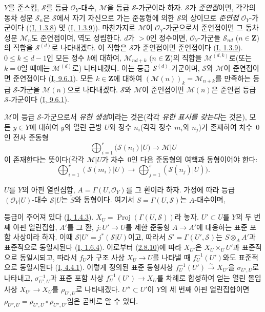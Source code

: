 \begin{env}[3.1.1]
\label{II.3.1.1-ko}
$Y$를 준스킴, $\mathcal{S}$를 등급 $\mathcal{O}_Y$-대수,
$\mathcal{M}$을 등급 $\mathcal{S}$-가군이라 하자. $\mathcal{S}$가
\emph{준연접}이면, 각각의 동차 성분 $\mathcal{S}_n$은 $\mathcal{S}$에서
자기 자신으로 가는 준동형에 의한 $\mathcal{S}$의 상이므로 \emph{준연접}
$\mathcal{O}_Y$-가군이다
((\hyperref[I.1.3.8-ko]{I, 1.3.8}) 및
(\hyperref[I.1.3.9-ko]{I, 1.3.9})). 마찬가지로 $\mathcal{M}$이
$\mathcal{O}_Y$-가군으로서 준연접이면 그 동차 성분 $\mathcal{M}_n$도
준연접이며, 역도 성립한다. $d$가 $>0$인 정수이면,
$\mathcal{O}_Y$-가군들 $\mathcal{S}_{nd}$ ($n\in\mathbf{Z}$)의 직합을
$\mathcal{S}^{(d)}$로 나타내겠다. 이 직합은 $\mathcal{S}$가 준연접이면
준연접이다 (\hyperref[I.1.3.9-ko]{I, 1.3.9}).
$0\leq k\leq d-1$인 모든 정수 $k$에 대하여, $\mathcal{M}_{nd+k}$
($n\in\mathbf{Z}$)의 직합을 $\mathcal{M}^{(d,k)}$로(또는 $k=0$일
때에는 $\mathcal{M}^{(d)}$로) 나타내겠다. 이는 등급
$\mathcal{S}^{(d)}$-가군이며, $\mathcal{S}$와 $\mathcal{M}$이 준연접이면
준연접이다 (\hyperref[I.9.6.1-ko]{I, 9.6.1}). 모든
$k\in\mathbf{Z}$에 대하여
$(\mathcal{M}(n))_k=\mathcal{M}_{n+k}$를 만족하는 등급
$\mathcal{S}$-가군을 $\mathcal{M}(n)$으로 나타내겠다. $\mathcal{S}$와
$\mathcal{M}$이 준연접이면 $\mathcal{M}(n)$은 준연접 등급
$\mathcal{S}$-가군이다 (\hyperref[I.9.6.1-ko]{I, 9.6.1}).

$\mathcal{M}$이 등급 $\mathcal{S}$-가군으로서 \emph{유한 생성}이라는
것은(각각 \emph{유한 표시를 갖는다}는 것은), 모든 $y\in Y$에 대하여
$y$의 열린 근방 $U$와 정수 $n_i$(각각 정수 $m_i$와 $n_j$)가 존재하여
차수~$0$인 전사 준동형
\[
  \bigoplus_{i=1}^r(\mathcal{S}(n_i)|U)\longrightarrow\mathcal{M}|U
\]
이 존재한다는 뜻이다(각각 $\mathcal{M}|U$가 차수~$0$인 다음 준동형의
여핵과 동형이어야 한다:
\[
  \bigoplus_{i=1}^r(\mathcal{S}(m_i)|U)
  \longrightarrow\bigoplus_{j=1}^s(\mathcal{S}(n_j)|U)).
\]

$U$를 $Y$의 아핀 열린집합, $A=\Gamma(U,\mathcal{O}_Y)$를 그 환이라
하자. 가정에 따라 등급 $(\mathcal{O}_Y|U)$-대수 $\mathcal{S}|U$는
$\widetilde{S}$와 동형이다. 여기서 $S=\Gamma(U,\mathcal{S})$는
$A$-대수이며,


등급이 주어져 있다 (\hyperref[I.1.4.3-ko]{I, 1.4.3}).
$X_U=\operatorname{Proj}(\Gamma(U,\mathcal{S}))$라 놓자.
$U'\subset U$를 $Y$의 두 번째 아핀 열린집합, $A'$를 그 환,
$j:U'\to U$를 제한 준동형 $A\to A'$에 대응하는 표준 포함 사상이라
하자. 이때 $\mathcal{S}|U'=j^*(\mathcal{S}|U)$이고, 따라서
$S'=\Gamma(U',\mathcal{S})$는 $S\otimes_A A'$과 표준적으로 동일시된다
(\hyperref[I.1.6.4-ko]{I, 1.6.4}). 이로부터
(\hyperref[II.2.8.10-ko]{2.8.10})에 따라 $X_{U'}$은
$X_U\times_U U'$과 표준적으로 동일시되고, 따라서 $f_U$가 구조 사상
$X_U\to U$를 나타낼 때 $f_U^{-1}(U')$와도 표준적으로 동일시된다
(\hyperref[I.4.4.1-ko]{I, 4.4.1}). 이렇게 정의된 표준 동형사상
$f_U^{-1}(U')\xrightarrow{\sim}X_{U'}$을 $\sigma_{U',U}$로 나타내고,
$\sigma_{U',U}^{-1}$과 표준 포함 사상 $f_U^{-1}(U')\to X_U$를 차례로
합성하여 얻는 열린 몰입 사상 $X_{U'}\to X_U$를 $\rho_{U',U}$로
나타내겠다. $U''\subset U'$이 $Y$의 세 번째 아핀 열린집합이면
$\rho_{U'',U}=\rho_{U',U}\circ\rho_{U'',U'}$임은 곧바로 알 수 있다.
\end{env}

